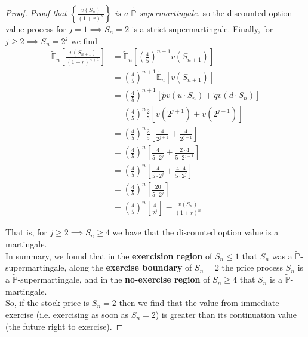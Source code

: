 \documentclass[12pt]{article}
\newlength\tindent
\renewcommand{\indent}{\hspace*{\tindent}}
\renewcommand{\P}{\mathbb P}
\newcommand{\E}{\mathbb E}
\begin{document}
\begin{proof} {\em Proof that $\left\{ \frac{v(S_n)}{(1 + r)^n} \right\} $ is a $\tilde{\P}$-supermartingale.}
so the discounted option value process for $j = 1 \implies S_n = 2$ is a strict supermartingale. Finally, for $j \geq 2 \implies S_n = 2^j$ we find
\begin{align*}
	\tilde{\E}_n \left[ \frac{ v(S_{n + 1}) }{ (1 + r)^{n + 1} } \right] &= \tilde{\E}_n \left[ \left( \frac{4}{5} \right)^{n + 1} v(S_{n + 1}) \right] \\
	&= \left( \frac{4}{5} \right)^{n + 1} \tilde{\E}_n \left[ v(S_{n + 1}) \right] \\
	&= \left( \frac{4}{5} \right)^{n + 1} \left[ \tilde{p} v(u \cdot S_n) + \tilde{q} v(d \cdot S_n) \right] \\
	&= \left( \frac{4}{5} \right)^n \frac{2}{5} \left[ v(2^{j + 1}) + v(2^{j - 1}) \right] \\
	&= \left( \frac{4}{5} \right)^n \frac{2}{5} \left[ \frac{4}{2^{j + 1}} + \frac{4}{2^{j - 1}} \right] \\
	&= \left( \frac{4}{5} \right)^n\left[ \frac{4}{5 \cdot 2^j} + \frac{2 \cdot 4}{5 \cdot 2^{j - 1}} \right] \\
	&= \left( \frac{4}{5} \right)^n\left[ \frac{4}{5 \cdot 2^j} + \frac{4 \cdot 4}{5 \cdot 2^j} \right] \\
	&= \left( \frac{4}{5} \right)^n\left[ \frac{20}{5 \cdot 2^j} \right] \\
	&= \left( \frac{4}{5} \right)^n\left[ \frac{4}{2^j} \right] = \frac{ v(S_n) }{ (1 + r)^n }
\end{align*}

\indent That is, for $j \geq 2 \implies S_n \geq 4$ we have that the discounted option value is a martingale. \\

\indent In summary, we found that in the {\bf exercision region} of $S_n \leq 1$ that $S_n$ was a $\tilde{\P}$-supermartingale, along the {\bf exercise boundary} of $S_n = 2$ the price process $S_n$ is a $\tilde{\P}$-supermartingale, and in the {\bf no-exercise region} of $S_n \geq 4$ that $S_n$ is a $\tilde{\P}$-martingale. \\

\indent So, if the stock price is $S_n = 2$ then we find that the value from immediate exercise (i.e. exercising as soon as $S_n = 2$) is greater than its continuation value (the future right to exercise).
\end{proof}
\end{document}
